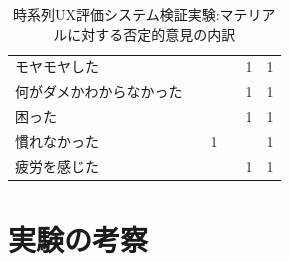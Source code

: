 \begin{table}[htbp]
\begin{tabular}{lrrrrr}
モヤモヤした       &                             &                            &                             & 1                          & 1                                       \\
何がダメかわからなかった &                             &                            &                             & 1                          & 1                                       \\
困った          &                             &                            &                             & 1                          & 1                                       \\
慣れなかった       &                             & 1                          &                             &                            & 1                                       \\
疲労を感じた       &                             &                            &                             & 1                          & 1                                      \\ \hline
\end{tabular}
\caption{時系列UX評価システム検証実験:マテリアルに対する否定的意見の内訳}
\label{table:nega}
\end{table}


\section{実験の考察}

